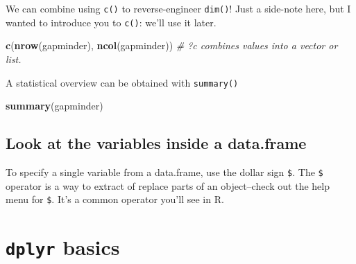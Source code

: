 \documentclass[]{book}
\newenvironment{Shaded}{\begin{snugshade}}{\end{snugshade}}
\newcommand{\KeywordTok}[1]{\textcolor[rgb]{0.13,0.29,0.53}{\textbf{#1}}}
\newcommand{\CommentTok}[1]{\textcolor[rgb]{0.56,0.35,0.01}{\textit{#1}}}
\newcommand{\OperatorTok}[1]{\textcolor[rgb]{0.81,0.36,0.00}{\textbf{#1}}}
\newcommand{\NormalTok}[1]{#1}
\theoremstyle{definition}
\theoremstyle{definition}
\theoremstyle{definition}
\theoremstyle{remark}
\begin{document}
We can combine using \texttt{c()} to reverse-engineer \texttt{dim()}!
Just a side-note here, but I wanted to introduce you to \texttt{c()}:
we'll use it later.

\begin{Shaded}
\begin{Highlighting}[]
\KeywordTok{c}\NormalTok{(}\KeywordTok{nrow}\NormalTok{(gapminder), }\KeywordTok{ncol}\NormalTok{(gapminder)) }\CommentTok{# ?c combines values into a vector or list. }
\end{Highlighting}
\end{Shaded}

A statistical overview can be obtained with \texttt{summary()}

\begin{Shaded}
\begin{Highlighting}[]
\KeywordTok{summary}\NormalTok{(gapminder)}
\end{Highlighting}
\end{Shaded}

\subsection{Look at the variables inside a
data.frame}\label{look-at-the-variables-inside-a-data.frame}

To specify a single variable from a data.frame, use the dollar sign
\texttt{\$}. The \texttt{\$} operator is a way to extract of replace
parts of an object--check out the help menu for \texttt{\$}. It's a
common operator you'll see in R.

\begin{Shaded}
\end{Shaded}

\section{\texorpdfstring{\texttt{dplyr}
basics}{dplyr basics}}\label{dplyr-basics}
\end{document}
